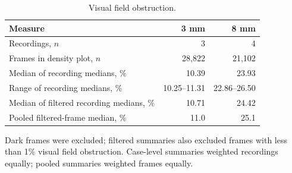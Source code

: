 \begin{table}[htbp]
\centering
\caption{Visual field obstruction.}
\label{tab:occlusion}
\small
\begin{tabularx}{\linewidth}{@{}Xrr@{}}
\toprule
Measure & 3 mm & 8 mm \\
\midrule
Recordings, $n$ & 3 & 4 \\
Frames in density plot, $n$ & 28,822 & 21,102 \\
Median of recording medians, \% & 10.39 & 23.93 \\
Range of recording medians, \% & 10.25--11.31 & 22.86--26.50 \\
Median of filtered recording medians, \% & 10.71 & 24.42 \\
Pooled filtered-frame median, \% & 11.0 & 25.1 \\
\bottomrule
\end{tabularx}
\par\smallskip
\begin{minipage}{\linewidth}\footnotesize
Dark frames were excluded; filtered summaries also excluded frames with less than 1\% visual field obstruction. Case-level summaries weighted recordings equally; pooled summaries weighted frames equally.
\end{minipage}
\end{table}
